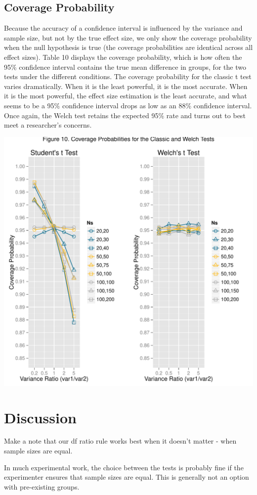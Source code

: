 \documentclass[man,a4paper,noextraspace]{apa6}\usepackage[]{graphicx}\usepackage[]{color}
\makeatletter
\def\maxwidth{ %
  \ifdim\Gin@nat@width>\linewidth
    \linewidth
  \else
    \Gin@nat@width
  \fi
}
\newenvironment{knitrout}{}{} %
\makeatother
\begin{document}
\subsection{Coverage Probability}
Because the accuracy of a confidence interval is influenced by the variance and sample size, but not by the true effect size, we only show the coverage probability when the null hypothesis is true (the coverage probabilities are identical across all effect sizes). Table 10 displays the coverage probability, which is how often the 95\% confidence interval contains the true mean difference in groups, for the two tests under the different conditions. The coverage probability for the classic t test varies dramatically. When it is the least powerful, it is the most accurate. When it is the most powerful, the effect size estimation is the least accurate, and what seems to be a 95\% confidence interval drops as low as an 88\% confidence interval. Once again, the Welch test retains the expected 95\% rate and turns out to best meet a researcher's concerns. 






\begin{knitrout}
\color{fgcolor}
\includegraphics[width=\maxwidth]{figure/coverage_plots} 

\end{knitrout}


\section{Discussion}
    Make a note that our df ratio rule works best when it doesn't matter - when sample sizes are equal.
    
    In much experimental work, the choice between the tests is probably fine if the experimenter ensures that sample sizes are equal. This is generally not an option with pre-existing groups. 
\end{document}
